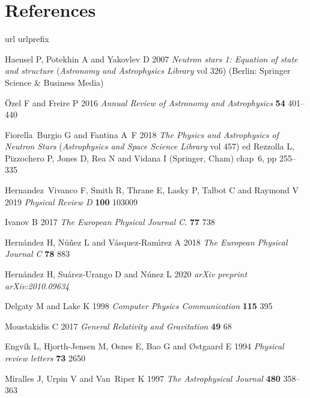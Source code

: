 \documentclass[a4paper]{jpconf} %
\begin{document}
\section*{References}
%
%
\providecommand{\newblock}{}
\begin{thebibliography}{10}
\expandafter\ifx\csname url\endcsname\relax
  \def\url#1{{\tt #1}}\fi
\expandafter\ifx\csname urlprefix\endcsname\relax\def\urlprefix{URL }\fi
\providecommand{\eprint}[2][]{\url{#2}}

Haensel P, Potekhin A and Yakovlev D 2007 {\em Neutron stars 1: Equation of
  state and structure\/} ({\em Astronomy and Astrophysics Library\/} vol 326)
  (Berlin: Springer Science \& Business Media)

{\"O}zel F and Freire P 2016 {\em Annual Review of Astronomy and
  Astrophysics\/} {\bf 54} 401--440

Fiorella~Burgio G and Fantina A~F 2018 {\em The Physics and Astrophysics of
  Neutron Stars\/} ({\em Astrophysics and Space Science Library\/} vol 457) ed
  Rezzolla L, Pizzochero P, Jones D, Rea N and Vidana I (Springer, Cham)
  chap~6, pp 255--335

Hernandez~Vivanco F, Smith R, Thrane E, Lasky P, Talbot C and Raymond V 2019
  {\em Physical Review D\/} {\bf 100} 103009

{Ivanov} B 2017 {\em The European Physical Journal C.\/} {\bf 77} 738

Hern{\'a}ndez H, N{\'u}{\~n}ez L and V{\'a}squez-Ram{\'\i}rez A 2018 {\em The
  European Physical Journal C\/} {\bf 78} 883

Hern{\'a}ndez H, Su{\'a}rez-Urango D and N{\'u}nez L 2020 {\em arXiv preprint
  arXiv:2010.09634\/}

Delgaty M and Lake K 1998 {\em Computer Physics Communication\/} {\bf 115} 395

{Moustakidis} C 2017 {\em General Relativity and Gravitation\/} {\bf 49} 68

Engvik L, Hjorth-Jensen M, Osnes E, Bao G and {\O}stgaard E 1994 {\em Physical
  review letters\/} {\bf 73} 2650

Miralles J, Urpin V and Van~Riper K 1997 {\em The Astrophysical Journal\/} {\bf
  480} 358--363


\end{thebibliography}
\end{document}
